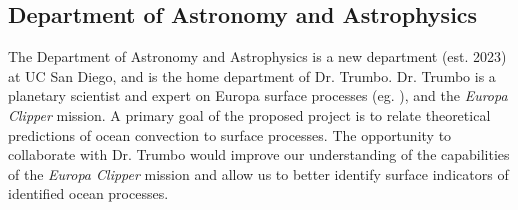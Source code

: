\documentclass{article}
\begin{document}
\subsection*{Department of Astronomy and Astrophysics}
The Department of Astronomy and Astrophysics is a new department (est. 2023) at UC San Diego, and is the home department of Dr. Trumbo. Dr. Trumbo is a planetary scientist and expert on Europa surface processes (eg. \cite{sT22,sT23}), and the \textit{Europa Clipper} mission. 
A primary goal of the proposed project is to relate theoretical predictions of ocean convection to surface processes. The opportunity to collaborate with Dr. Trumbo would improve our understanding of the capabilities of the \textit{Europa Clipper} mission and allow us to better identify surface indicators of identified ocean processes.


\printbibliography
\end{document}
